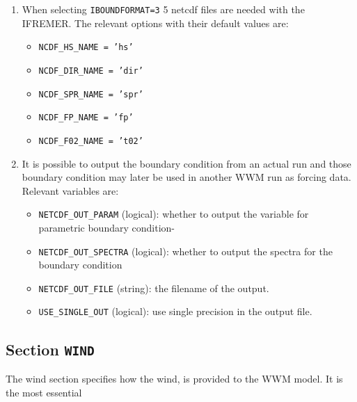 \documentclass[12pt]{amsart}
\begin{document}
\begin{enumerate}
\item When selecting {\tt IBOUNDFORMAT=3} 5 netcdf files are needed with the IFREMER. The relevant options with their default values are:
  \begin{itemize}
  \item {\tt NCDF\_HS\_NAME = 'hs'}
  \item {\tt NCDF\_DIR\_NAME  = 'dir'}
  \item {\tt NCDF\_SPR\_NAME  = 'spr'}
  \item {\tt NCDF\_FP\_NAME   = 'fp'}
  \item {\tt NCDF\_F02\_NAME  = 't02'}
  \end{itemize}
\item It is possible to output the boundary condition from an actual run and those boundary condition may later be used in another WWM run as forcing data. Relevant variables are:
  \begin{itemize}
  \item {\tt NETCDF\_OUT\_PARAM} (logical): whether to output the variable for parametric boundary condition-
  \item {\tt NETCDF\_OUT\_SPECTRA} (logical): whether to output the spectra for the boundary condition
  \item {\tt NETCDF\_OUT\_FILE} (string): the filename of the output.
  \item {\tt USE\_SINGLE\_OUT} (logical): use single precision in the output file.
  \end{itemize}
  
  

\end{enumerate}






\subsection{Section {\tt WIND}}
The wind section specifies how the wind, is provided to the WWM model. It is the most essential
\end{document}
